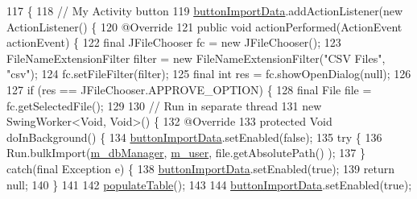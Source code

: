 \begin{DoxyCode}
117                                         \{
118         \textcolor{comment}{// My Activity button}
119         \mbox{\hyperlink{classcom_1_1activitytracker_1_1_main_window_a2e469a48de58cf91979d95148972379b}{buttonImportData}}.addActionListener(\textcolor{keyword}{new} ActionListener() \{
120             @Override
121             \textcolor{keyword}{public} \textcolor{keywordtype}{void} actionPerformed(ActionEvent actionEvent) \{
122                 \textcolor{keyword}{final} JFileChooser fc = \textcolor{keyword}{new} JFileChooser();
123                 FileNameExtensionFilter filter = \textcolor{keyword}{new} FileNameExtensionFilter(\textcolor{stringliteral}{"CSV Files"}, \textcolor{stringliteral}{"csv"});
124                 fc.setFileFilter(filter);
125                 \textcolor{keyword}{final} \textcolor{keywordtype}{int} res = fc.showOpenDialog(null);
126 
127                 \textcolor{keywordflow}{if} (res == JFileChooser.APPROVE\_OPTION) \{
128                     \textcolor{keyword}{final} File file = fc.getSelectedFile();
129 
130                     \textcolor{comment}{// Run in separate thread}
131                     \textcolor{keyword}{new} SwingWorker<Void, Void>() \{
132                         @Override
133                         \textcolor{keyword}{protected} Void doInBackground() \{
134                             \mbox{\hyperlink{classcom_1_1activitytracker_1_1_main_window_a2e469a48de58cf91979d95148972379b}{buttonImportData}}.setEnabled(\textcolor{keyword}{false});
135                             \textcolor{keywordflow}{try} \{
136                                 Run.bulkImport(\mbox{\hyperlink{classcom_1_1activitytracker_1_1_main_window_ab2af51cb35794567e55564a4d3abbb79}{m\_dbManager}}, \mbox{\hyperlink{classcom_1_1activitytracker_1_1_main_window_a96e28fa47e1740a7ddc16aa48406db85}{m\_user}}, file.getAbsolutePath()
      );
137                             \} \textcolor{keywordflow}{catch}(\textcolor{keyword}{final} Exception e) \{
138                                 \mbox{\hyperlink{classcom_1_1activitytracker_1_1_main_window_a2e469a48de58cf91979d95148972379b}{buttonImportData}}.setEnabled(\textcolor{keyword}{true});
139                                 \textcolor{keywordflow}{return} null;
140                             \}
141 
142                             \mbox{\hyperlink{classcom_1_1activitytracker_1_1_main_window_ae3955dd50087d95257d029b9c67ac185}{populateTable}}();
143 
144                             \mbox{\hyperlink{classcom_1_1activitytracker_1_1_main_window_a2e469a48de58cf91979d95148972379b}{buttonImportData}}.setEnabled(\textcolor{keyword}{true});

\end{DoxyCode}
